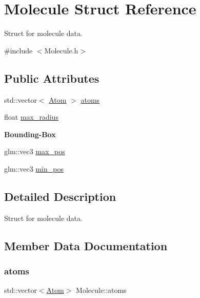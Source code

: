 \hypertarget{struct_molecule}{}\section{Molecule Struct Reference}
\label{struct_molecule}


Struct for molecule data.  




{\ttfamily \#include $<$Molecule.\+h$>$}

\subsection*{Public Attributes}
\begin{DoxyCompactItemize}
\item 
std\+::vector$<$ \mbox{\hyperlink{struct_atom}{Atom}} $>$ \mbox{\hyperlink{struct_molecule_a69365132d17fe1d98a0954960ae1eb00}{atoms}}
\item 
float \mbox{\hyperlink{struct_molecule_a01e9bc4e0fc5fc24d8793434741dcfa3}{max\+\_\+radius}}
\end{DoxyCompactItemize}
\begin{Indent}\textbf{ Bounding-\/\+Box}\par
\begin{DoxyCompactItemize}
\item 
glm\+::vec3 \mbox{\hyperlink{struct_molecule_a0ffe6af0a1ea4ff5cbbdd1a2a922253b}{max\+\_\+pos}}
\item 
glm\+::vec3 \mbox{\hyperlink{struct_molecule_a8a7e5c28190e929197dee74935604f67}{min\+\_\+pos}}
\end{DoxyCompactItemize}
\end{Indent}


\subsection{Detailed Description}
Struct for molecule data. 



\subsection{Member Data Documentation}
\mbox{\label{struct_molecule_a69365132d17fe1d98a0954960ae1eb00}} 
\subsubsection{\texorpdfstring{atoms}{atoms}}
{\footnotesize\ttfamily std\+::vector$<$\mbox{\hyperlink{struct_atom}{Atom}}$>$ Molecule\+::atoms}

